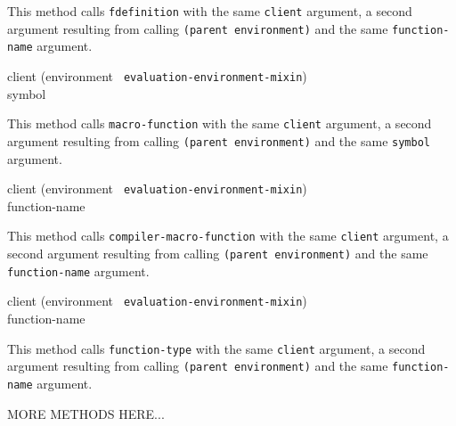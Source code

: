 This method calls \texttt{fdefinition} with the same \texttt{client} argument,
a second argument resulting from calling \texttt{(parent environment)} and the
same \texttt{function-name} argument.

{\small{} {client (environment {\tt
      evaluation-environment-mixin}) \\ symbol}
}

This method calls \texttt{macro-function} with the same \texttt{client}
argument, a second argument resulting from calling \texttt{(parent
  environment)} and the same \texttt{symbol} argument.

{\small{} {client (environment {\tt
      evaluation-environment-mixin}) \\ function-name}
}

This method calls \texttt{compiler-macro-function} with the same
\texttt{client} argument, a second argument resulting from calling
\texttt{(parent environment)} and the same \texttt{function-name} argument.

{\small{} {client (environment {\tt
      evaluation-environment-mixin}) \\ function-name}
}

This method calls \texttt{function-type} with the same \texttt{client}
argument, a second argument resulting from calling \texttt{(parent
  environment)} and the same \texttt{function-name} argument.

MORE METHODS HERE...

